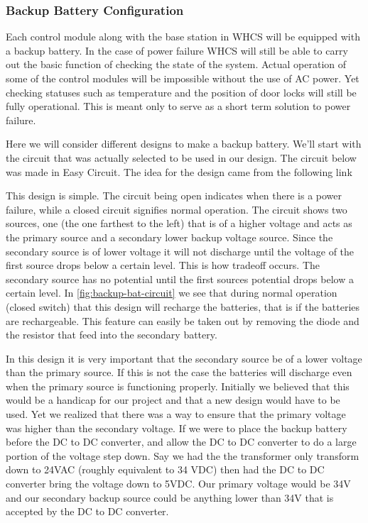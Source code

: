 \subsubsection{Backup Battery Configuration}
Each control module along with the base station in WHCS will be equipped with a
backup battery. In the case of power failure WHCS will still be able to carry
out the basic function of checking the state of the system. Actual operation of
some of the control modules will be impossible without the use of AC power. Yet
checking statuses such as temperature and the position of door locks will still
be fully operational. This is meant only to serve as a short term solution to
power failure.

Here we will consider different designs to make a backup battery. We{}'ll start
with the circuit that was actually selected to be used in our design. The
circuit below was made in Easy Circuit. The idea for the design came from the
following link



This design is simple. The circuit being open indicates when there is a power
failure, while a closed circuit signifies normal operation. The circuit shows
two sources, one (the one farthest to the left) that is of a higher voltage and
acts as the primary source and a secondary lower backup voltage source. Since
the secondary source is of lower voltage it will not discharge until the
voltage of the first source drops below a certain level. This is how tradeoff
occurs.  The secondary source has no potential until the first sources
potential drops below a certain level. In \autoref{fig:backup-bat-circuit} we see that
during normal operation (closed switch) that this design will recharge the
batteries, that is if the batteries are rechargeable. This feature can easily
be taken out by removing the diode and the resistor that feed into the
secondary battery.

In this design it is very important that the secondary source be of a lower
voltage than the primary source. If this is not the case the batteries will
discharge even when the primary source is functioning properly. Initially we
believed that this would be a handicap for our project and that a new design
would have to be used. Yet we realized that there was a way to ensure that the
primary voltage was higher than the secondary voltage. If we were to place the
backup battery before the DC to DC converter, and allow the DC to DC converter
to do a large portion of the voltage step down.  Say we had the the transformer
only transform down to 24VAC (roughly equivalent to 34 VDC) then had the DC to
DC converter bring the voltage down to 5VDC. Our primary voltage would be 34V
and our secondary backup source could be anything lower than 34V that is
accepted by the DC to DC converter.

